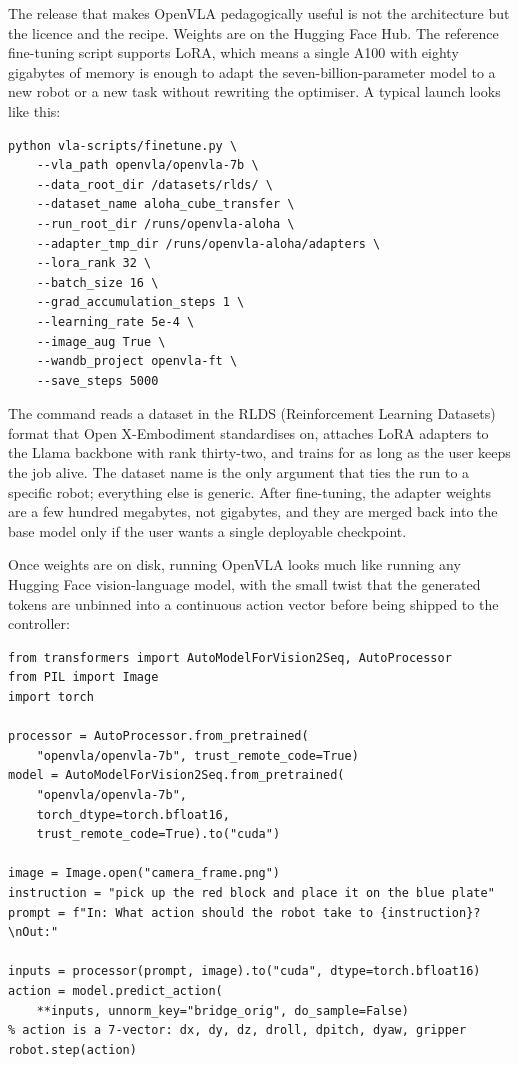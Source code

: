  The release that makes OpenVLA pedagogically useful is not the architecture but the licence and the recipe. Weights are on the Hugging Face Hub. The reference fine-tuning script supports LoRA, which means a single A100 with eighty gigabytes of memory is enough to adapt the seven-billion-parameter model to a new robot or a new task without rewriting the optimiser. A typical launch looks like this:

\begin{verbatim}
python vla-scripts/finetune.py \
    --vla_path openvla/openvla-7b \
    --data_root_dir /datasets/rlds/ \
    --dataset_name aloha_cube_transfer \
    --run_root_dir /runs/openvla-aloha \
    --adapter_tmp_dir /runs/openvla-aloha/adapters \
    --lora_rank 32 \
    --batch_size 16 \
    --grad_accumulation_steps 1 \
    --learning_rate 5e-4 \
    --image_aug True \
    --wandb_project openvla-ft \
    --save_steps 5000
\end{verbatim}

The command reads a dataset in the RLDS (Reinforcement Learning Datasets) format that Open X-Embodiment standardises on, attaches LoRA adapters to the Llama backbone with rank thirty-two, and trains for as long as the user keeps the job alive. The dataset name is the only argument that ties the run to a specific robot; everything else is generic. After fine-tuning, the adapter weights are a few hundred megabytes, not gigabytes, and they are merged back into the base model only if the user wants a single deployable checkpoint.

\newthought{Inference is even smaller.} Once weights are on disk, running OpenVLA looks much like running any Hugging Face vision-language model, with the small twist that the generated tokens are unbinned into a continuous action vector before being shipped to the controller:

\begin{verbatim}
from transformers import AutoModelForVision2Seq, AutoProcessor
from PIL import Image
import torch

processor = AutoProcessor.from_pretrained(
    "openvla/openvla-7b", trust_remote_code=True)
model = AutoModelForVision2Seq.from_pretrained(
    "openvla/openvla-7b",
    torch_dtype=torch.bfloat16,
    trust_remote_code=True).to("cuda")

image = Image.open("camera_frame.png")
instruction = "pick up the red block and place it on the blue plate"
prompt = f"In: What action should the robot take to {instruction}?\nOut:"

inputs = processor(prompt, image).to("cuda", dtype=torch.bfloat16)
action = model.predict_action(
    **inputs, unnorm_key="bridge_orig", do_sample=False)
% action is a 7-vector: dx, dy, dz, droll, dpitch, dyaw, gripper
robot.step(action)
\end{verbatim}

